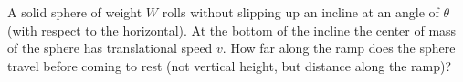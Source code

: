 A solid sphere of weight $W$ rolls without slipping up an incline at
an angle of $\theta$ (with respect to the horizontal). At the bottom
of the incline the center of mass of the sphere has translational
speed $v$. How far along the ramp does the sphere travel before
coming to rest (not vertical height, but distance along the ramp)?\answercheck
